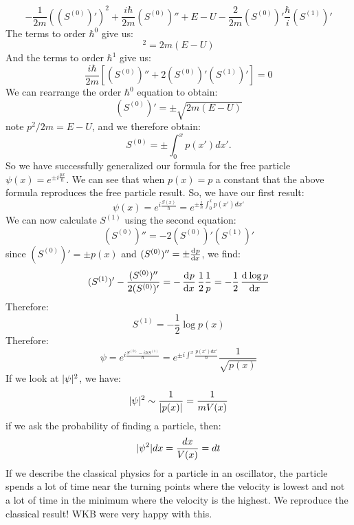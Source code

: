 \begin{equation}
    -\frac{1}{2m}\left((S^{(0)})'\right)^2 + \frac{i\hbar}{2m}(S^{(0)})'' + E - U - \frac{2}{2m}(S^{(0)})' \frac{\hbar}{i}(S^{(1)})'
\end{equation}
The terms to order $\hbar^0$ give us:
\begin{equation}
    [(S^{(0)})']^2 = 2m(E - U)
\end{equation}
And the terms to order $\hbar^1$ give us:
\begin{equation}
    \frac{i\hbar}{2m}\left[(S^{(0)})'' + 2(S^{(0)})'(S^{(1)})'\right] = 0
\end{equation}
We can rearrange the order $\hbar^0$ equation to obtain:
\begin{equation}
    (S^{(0)})' = \pm \sqrt{2m(E - U)}
\end{equation}
note $p^2/2m = E - U$, and we therefore obtain:
\begin{equation}
    S^{(0)} = \pm \int_0^x p(x') dx'.
\end{equation} 
So we have successfully generalized our formula for the free particle $\psi(x) = e^{\pm i \frac{px}{\hbar}}$. We can see that when $p(x) = p$ a constant that the above formula reproduces the free particle result. So, we have our first result:
\begin{equation}
    \psi(x) = e^{i\frac{S(x)}{\hbar}} = e^{\pm\frac{i}{\hbar}\int_0^x p(x')dx'}
\end{equation}
We can now calculate $S^{(1)}$ using the second equation:
\begin{equation}
    (S^{(0)})'' = - 2(S^{(0)})'(S^{(1)})'
\end{equation}
since $(S^{(0)})' = \pm p(x)$ and $(S^{(0)})'' = \pm \od{p}{x}$, we find:
\begin{equation}
    (S^{(1)})'  -\frac{(S^{(0)})''}{2(S^{(0)})'} = -\dod{p}{x}\frac{1}{2}\frac{1}{p} = -\frac{1}{2}\dod{\log p}{x}
\end{equation}
Therefore:
\begin{equation}
    S^{(1)} = -\frac{1}{2}\log p(x)
\end{equation}
Therefore:
\begin{equation}
    \psi = e^{i\frac{S^{(0)} - i\hbar S^{(1)}}{\hbar}} = e^{\pm i \int^x \frac{p(x')dx'}{\hbar}}\frac{1}{\sqrt{p(x)}}
\end{equation}
If we look at $\lvert \psi \rvert^2$, we have:
\begin{equation}
    \lvert \psi \rvert^2 \sim \frac{1}{\lvert p(x) \rvert} = \frac{1}{mV(x)}
\end{equation}
if we ask the probability of finding a particle, then:
\begin{equation}
    \lvert \psi^2 \rvert dx = \frac{dx}{V(x)} = dt
\end{equation}
If we describe the classical physics for a particle in an oscillator, the particle spends a lot of time near the turning points where the velocity is lowest and not a lot of time in the minimum where the velocity is the highest. We reproduce the classical result! WKB were very happy with this.

